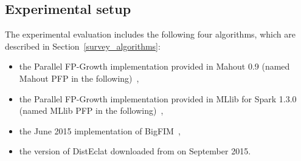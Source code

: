 
\subsection{Experimental setup}
The experimental evaluation includes the following four algorithms, 
which are described in Section~\ref{survey_algorithms}:
\begin{itemize}
\item the Parallel FP-Growth implementation provided in Mahout 0.9 (named Mahout PFP in the following)~\cite{Mahout},
\item the Parallel FP-Growth implementation provided in MLlib for Spark 1.3.0 (named MLlib PFP in the following)~\cite{MLLib},
\item the June 2015 implementation of BigFIM~\cite{Bigfim_github},
\item the version of DistEclat downloaded from \cite{Bigfim_github} on September 2015.
\end{itemize}


